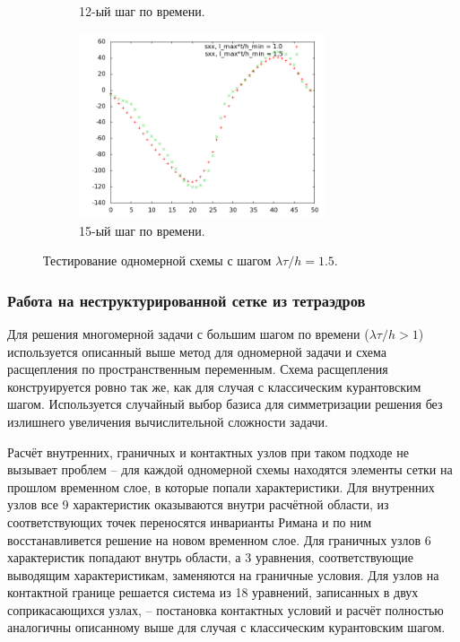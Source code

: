 \begin{figure}[htp]
\begin{subfigure}[b]{0.5\textwidth}
\caption{12-ый шаг по времени.}
\end{subfigure}
\begin{subfigure}[b]{0.5\textwidth}
\centering
\includegraphics[width=0.8\textwidth]{png/big-sigma-test-results-1d/snap-15.png}
\caption{15-ый шаг по времени.}
\end{subfigure}
\caption{Тестирование одномерной схемы с шагом $\lambda \tau / h = 1.5$.}
\label{pic:scheme_1d_test}
\end{figure}

\clearpage
\newpage

\subsubsection{Работа на неструктурированной сетке из тетраэдров}

Для решения многомерной задачи с большим шагом по времени ($\lambda \tau / h > 1$) используется описанный выше метод для одномерной задачи и схема расщепления по пространственным переменным. Схема расщепления конструируется ровно так же, как для случая с классическим курантовским шагом. Используется случайный выбор базиса для симметризации решения без излишнего увеличения вычислительной сложности задачи.

Расчёт внутренних, граничных и контактных узлов при таком подходе не вызывает проблем -- для каждой одномерной схемы находятся элементы сетки на прошлом временном слое, в которые попали характеристики. Для внутренних узлов все 9 характеристик оказываются внутри расчётной области, из соответствующих точек переносятся инварианты Римана и по ним восстанавливется решение на новом временном слое. Для граничных узлов 6 характеристик попадают внутрь области, а 3 уравнения, соответствующие выводящим характеристикам, заменяются на граничные условия. Для узлов на контактной границе решается система из 18 уравнений, записанных в двух соприкасающихся узлах, -- постановка контактных условий и расчёт полностью аналогичны описанному выше для случая с классическим курантовским шагом.


